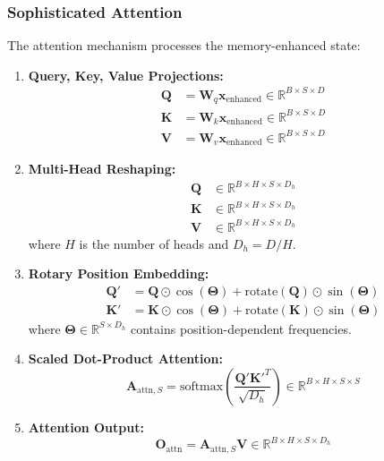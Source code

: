 \documentclass{article}
\begin{document}
\subsubsection{Sophisticated Attention}

The attention mechanism processes the memory-enhanced state:

\begin{enumerate}
\item \textbf{Query, Key, Value Projections:}
\begin{align}
\mathbf{Q} &= \mathbf{W}_q \mathbf{x}_{\text{enhanced}} \in \mathbb{R}^{B \times S \times D} \\
\mathbf{K} &= \mathbf{W}_k \mathbf{x}_{\text{enhanced}} \in \mathbb{R}^{B \times S \times D} \\
\mathbf{V} &= \mathbf{W}_v \mathbf{x}_{\text{enhanced}} \in \mathbb{R}^{B \times S \times D}
\end{align}

\item \textbf{Multi-Head Reshaping:}
\begin{align}
\mathbf{Q} &\in \mathbb{R}^{B \times H \times S \times D_h} \\
\mathbf{K} &\in \mathbb{R}^{B \times H \times S \times D_h} \\
\mathbf{V} &\in \mathbb{R}^{B \times H \times S \times D_h}
\end{align}
where $H$ is the number of heads and $D_h = D/H$.

\item \textbf{Rotary Position Embedding:}
\begin{align}
\mathbf{Q}' &= \mathbf{Q} \odot \cos(\boldsymbol{\Theta}) + \text{rotate}(\mathbf{Q}) \odot \sin(\boldsymbol{\Theta}) \\
\mathbf{K}' &= \mathbf{K} \odot \cos(\boldsymbol{\Theta}) + \text{rotate}(\mathbf{K}) \odot \sin(\boldsymbol{\Theta})
\end{align}
where $\boldsymbol{\Theta} \in \mathbb{R}^{S \times D_h}$ contains position-dependent frequencies.

\item \textbf{Scaled Dot-Product Attention:}
\begin{equation}
\mathbf{A}_{\text{attn},S} = \text{softmax}\left(\frac{\mathbf{Q}' \mathbf{K}'^T}{\sqrt{D_h}}\right) \in \mathbb{R}^{B \times H \times S \times S}
\end{equation}

\item \textbf{Attention Output:}
\begin{equation}
\mathbf{O}_{\text{attn}} = \mathbf{A}_{\text{attn},S} \mathbf{V} \in \mathbb{R}^{B \times H \times S \times D_h}
\end{equation}


\end{enumerate}
\end{document}
